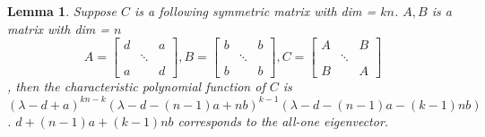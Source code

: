 \documentclass{article}
\newtheorem{lemma}{Lemma}
\begin{document}
\begin{lemma}\label{lem:Cabd2}
	Suppose $C$ is a following symmetric matrix with dim = $kn$.
	$A, B$ is a matrix with dim = $n$
	$$A=\begin{bmatrix}
	d & \text{ } & a \\
	& \ddots & \\
	a & \text{ } & d 
	\end{bmatrix},
	B=\begin{bmatrix}
	b & \text{ } & b \\
	& \ddots & \\
	b & \text{ } & b 
	\end{bmatrix},
	 C=\begin{bmatrix} 
	 	A & \text{ } & B \\
	 & \ddots & \\
	 B & \text{ } & A 
	\end{bmatrix}$$,
	then the characteristic polynomial function of $C$ is $(\lambda - d + a)^{kn-k} (\lambda - d - (n-1)a + nb)^{k-1}
	(\lambda - d - (n-1)a -(k-1)nb)$. $d + (n-1)a + (k-1)nb$ corresponds to the all-one eigenvector.
\end{lemma}
\end{document}
